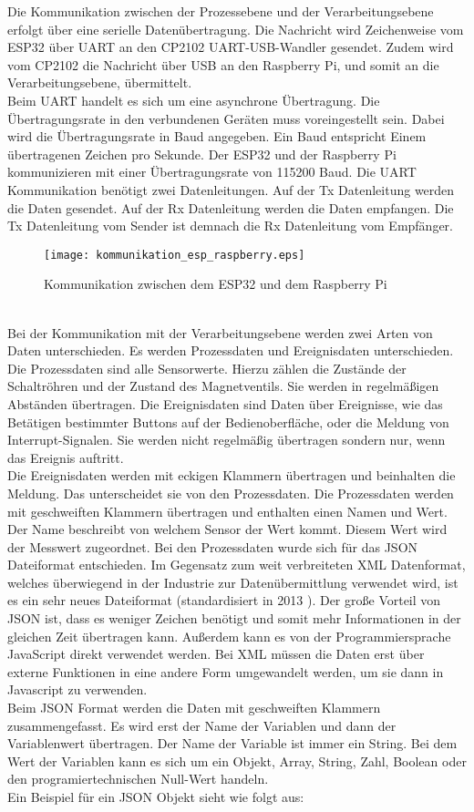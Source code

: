 Die Kommunikation zwischen der Prozessebene und der Verarbeitungsebene erfolgt über eine serielle Datenübertragung. Die Nachricht wird Zeichenweise vom ESP32 über UART an den CP2102 UART-USB-Wandler gesendet. Zudem wird vom CP2102 die Nachricht über USB an den Raspberry Pi, und somit an die Verarbeitungsebene, übermittelt.
\\
Beim UART handelt es sich um eine asynchrone Übertragung. Die Übertragungsrate in den verbundenen Geräten muss voreingestellt sein. Dabei wird die Übertragungsrate in Baud angegeben. Ein Baud entspricht Einem übertragenen Zeichen pro Sekunde. Der ESP32 und der Raspberry Pi kommunizieren mit einer Übertragungsrate von 115200 Baud. Die UART Kommunikation benötigt zwei Datenleitungen. Auf der Tx Datenleitung werden die Daten gesendet. Auf der Rx Datenleitung werden die Daten empfangen. Die Tx Datenleitung vom Sender ist demnach die Rx Datenleitung vom Empfänger.
\begin{figure}[h]
\centering
\texttt{[image: kommunikation\_esp\_raspberry.eps]}
\caption{Kommunikation zwischen dem ESP32 und dem Raspberry Pi}
\label{flussdiagramm_steuerung}
\end{figure}
\\
\noindent
Bei der Kommunikation mit der Verarbeitungsebene werden zwei Arten von Daten unterschieden. Es werden Prozessdaten und Ereignisdaten unterschieden. Die Prozessdaten sind alle Sensorwerte. Hierzu zählen die Zustände der Schaltröhren und der Zustand des Magnetventils. Sie werden in regelmäßigen Abständen übertragen. Die Ereignisdaten sind Daten über Ereignisse, wie das Betätigen bestimmter Buttons auf der Bedienoberfläche, oder die Meldung von Interrupt-Signalen. Sie werden nicht regelmäßig übertragen sondern nur, wenn das Ereignis auftritt.
\\
Die Ereignisdaten werden mit eckigen Klammern übertragen und beinhalten die Meldung. Das unterscheidet sie von den Prozessdaten. Die Prozessdaten werden mit geschweiften Klammern übertragen und enthalten einen Namen und Wert. Der Name beschreibt von welchem Sensor der Wert kommt. Diesem Wert wird der Messwert zugeordnet. Bei den Prozessdaten wurde sich für das JSON Dateiformat entschieden. Im Gegensatz zum weit verbreiteten XML Datenformat, welches überwiegend in der Industrie zur Datenübermittlung verwendet wird, ist es ein sehr neues Dateiformat (standardisiert in 2013 \cite{JSON2013}). Der große Vorteil von JSON ist, dass es weniger Zeichen benötigt und somit mehr Informationen in der gleichen Zeit übertragen kann. Außerdem kann es von der Programmiersprache JavaScript direkt verwendet werden. Bei XML müssen die Daten erst über externe Funktionen in eine andere Form umgewandelt werden, um sie dann in Javascript zu verwenden.
\\
Beim JSON Format werden die Daten mit geschweiften Klammern zusammengefasst. Es wird erst der Name der Variablen und dann der Variablenwert übertragen. Der Name der Variable ist immer ein String. Bei dem Wert der Variablen kann es sich um ein Objekt, Array, String, Zahl, Boolean oder den programiertechnischen Null-Wert handeln.
\cite{json}
\\
Ein Beispiel für ein JSON Objekt sieht wie folgt aus:

